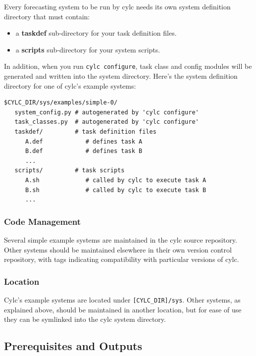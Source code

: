 \documentclass[11pt,a4paper]{article}
\begin{document}
Every forecasting system to be run by cylc needs its own system
definition directory that must contain: 

\begin{itemize} 
    \item a {\bf taskdef} sub-directory for your task definition files.
    \item a {\bf scripts} sub-directory for your system scripts.
\end{itemize} 

In addition, when you run \lstinline{cylc configure}, task class and
config modules will be generated and written into the system directory.
Here's the system definition directory for one of cylc's example
systems: 

\lstset{language=bash}
\begin{lstlisting}
$CYLC_DIR/sys/examples/simple-0/
   system_config.py # autogenerated by 'cylc configure' 
   task_classes.py  # autogenerated by 'cylc configure' 
   taskdef/         # task definition files
      A.def            # defines task A
      B.def            # defines task B
      ...
   scripts/         # task scripts
      A.sh             # called by cylc to execute task A
      B.sh             # called by cylc to execute task B
      ...
\end{lstlisting}

\subsubsection{Code Management}

Several simple example systems are maintained in the cylc source
repository.  Other systems should be maintained elsewhere in their
own version control repository, with tags indicating compatibility with
particular versions of cylc.

\subsubsection{Location}

Cylc's example systems are located under \lstinline=[CYLC_DIR]/sys=.
Other systems, as explained above, should be maintained in another
location, but for ease of use they can be symlinked into the cylc system
directory.



\label{sec:requisites}
\subsection{Prerequisites and Outputs}
\end{document}
